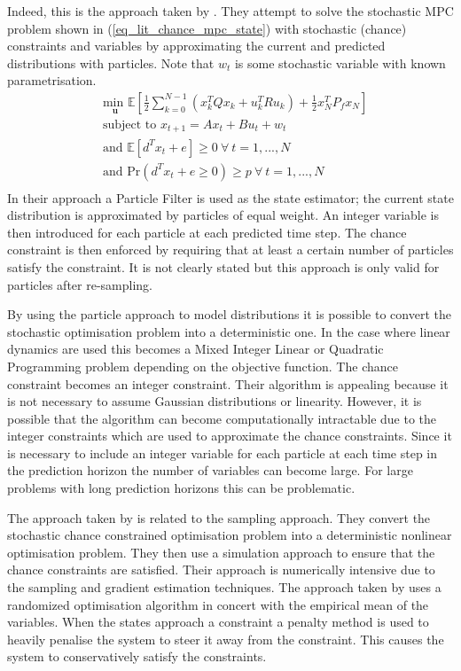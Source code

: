 Indeed, this is the approach taken by \cite{blackmore}. They attempt to solve the stochastic MPC problem shown in (\ref{eq_lit_chance_mpc_state}) with stochastic (chance) constraints and variables by approximating the current and predicted distributions with particles. Note that $w_t$ is some stochastic variable with known parametrisation.
\begin{equation}
\begin{aligned}
&\underset{\mathbf{u}}{\text{min }} \mathbb{E}\left[ \frac{1}{2}\sum_{k=0}^{N-1} \left( x_k^TQx_k + u_k^TRu_k \right) + \frac{1}{2}x_N^TP_fx_N \right] \\
& \text{subject to } x_{t+1}=Ax_t+Bu_t + w_t \\
& \text{and } \mathbb{E}[d^Tx_t + e] \geq 0 ~\forall ~t=1,...,N \\
& \text{and } \text{Pr}(d^Tx_t + e \geq 0) \geq p ~\forall ~t=1,...,N\\
\end{aligned}
\label{eq_lit_chance_mpc_state}
\end{equation}
In their approach a Particle Filter is used as the state estimator; the current state distribution is approximated by particles of equal weight. An integer variable is then introduced for each particle at each predicted time step. The chance constraint is then enforced by requiring that at least a certain number of particles satisfy the constraint. It is not clearly stated but this approach is only valid for particles after re-sampling. 

By using the particle approach to model distributions it is possible to convert the stochastic optimisation problem into a deterministic one. In the case where linear dynamics are used this becomes a Mixed Integer Linear or Quadratic Programming problem depending on the objective function. The chance constraint becomes an integer constraint. Their algorithm is appealing because it is not necessary to assume Gaussian distributions or linearity. However, it is possible that the algorithm can become computationally intractable due to the integer constraints which are used to approximate the chance constraints. Since it is necessary to include an integer variable for each particle at each time step in the prediction horizon the number of variables can become large. For large problems with long prediction horizons this can be problematic.  

The approach taken by \cite{li} is related to the sampling approach. They convert the stochastic chance constrained optimisation problem into a deterministic nonlinear optimisation problem. They then use a simulation approach to ensure that the chance constraints are satisfied. Their approach is numerically intensive due to the sampling and gradient estimation techniques. The approach taken by \cite{batina} uses a randomized optimisation algorithm in concert with the empirical mean of the variables. When the states approach a constraint a penalty method is used to heavily penalise the system to steer it away from the constraint. This causes the system to conservatively satisfy the constraints.

